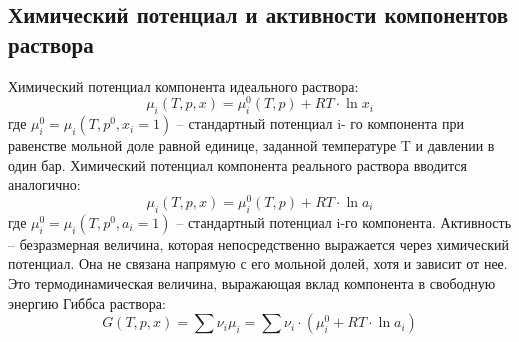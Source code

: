 \documentclass[a4paper, 12pt]{article}
\begin{document}
\subsection{Химический потенциал и активности компонентов раствора}
Химический потенциал компонента идеального раствора:
\begin{equation}
\mu_{i}(T, p, x)=\mu_{i}^{0}(T, p)+R T \cdot \ln x_{i}
\end{equation}
где $\mu_{i}^{0}=\mu_{i}\left(T, p^{0}, x_{i}=1\right)$ – стандартный потенциал i- го компонента при равенстве мольной доле равной единице, заданной температуре T и давлении в один бар. Химический потенциал компонента реального раствора вводится аналогично:
\begin{equation}
\mu_{i}(T, p, x)=\mu_{i}^{0}(T, p)+R T \cdot \ln a_{i}
\end{equation}
где $\mu_{i}^{0}=\mu_{i}\left(T, p^{0}, a_{i}=1\right)$ – стандартный потенциал i-го компонента.
Активность – безразмерная величина, которая непосредственно выражается через химический потенциал. Она не связана напрямую с его мольной долей, хотя и зависит от нее. Это термодинамическая величина, выражающая вклад компонента в свободную энергию Гиббса раствора:
\begin{equation}
G(T, p, x)=\sum \nu_{i} \mu_{i}=\sum \nu_{i} \cdot\left(\mu_{i}^{0}+R T \cdot \ln a_{i}\right)
\end{equation}
\end{document}
